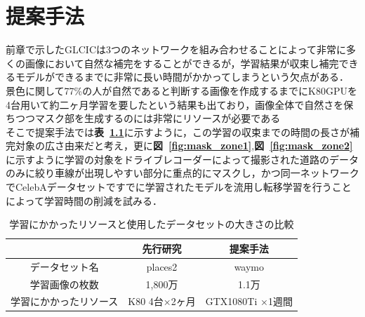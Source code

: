 \documentclass[a4j, 11pt]{jreport}
\newcommand{\figref}[1]{\textbf{図~\ref{#1}}}
\newcommand{\tabref}[1]{\textbf{表~\ref{#1}}}
\begin{document}
\chapter{提案手法}
前章で示したGLCICは3つのネットワークを組み合わせることによって非常に多くの画像において自然な補完をすることができるが，学習結果が収束し補完できるモデルができるまでに非常に長い時間がかかってしまうという欠点がある．\\
景色に関して77\%の人が自然であると判断する画像を作成するまでにK80GPUを4台用いて約二ヶ月学習を要したという結果も出ており，画像全体で自然さを保ちつつマスク部を生成するのには非常にリソースが必要である\\
そこで提案手法では\tabref{tb:compare_learning}に示すように，この学習の収束までの時間の長さが補完対象の広さ由来だと考え，更に\figref{fig:mask_zone1},\figref{fig:mask_zone2}に示すように学習の対象をドライブレコーダーによって撮影された道路のデータのみに絞り車線が出現しやすい部分に重点的にマスクし，かつ同一ネットワークでCelebAデータセットですでに学習されたモデルを流用し転移学習を行うことによって学習時間の削減を試みる．
\begin{table}[H]
	\caption{学習にかかったリソースと使用したデータセットの大きさの比較}
	\centering	
	\label{tb:compare_learning}
	\begin{tabular}{|c|c|c|}
	\hline
			   & 先行研究       & 提案手法           \\ \hline
	データセット名    & places2    & waymo          \\ \hline
	学習画像の枚数    & 1,800万     & 1.1万            \\ \hline
	学習にかかったリソース & K80 4台×2ヶ月 & GTX1080Ti ×1週間 \\ \hline
	\end{tabular}
	\end{table}
\end{document}
